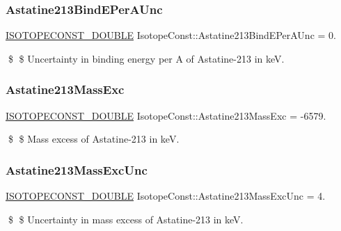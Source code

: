 \subsubsection{\texorpdfstring{Astatine213\+Bind\+E\+Per\+A\+Unc}{Astatine213BindEPerAUnc}}
{\footnotesize\ttfamily \mbox{\hyperlink{group___isotope_const-_macros_ga8f45a7272ce02c0b4c65c44636ed719a}{I\+S\+O\+T\+O\+P\+E\+C\+O\+N\+S\+T\+\_\+\+D\+O\+U\+B\+LE}} Isotope\+Const\+::\+Astatine213\+Bind\+E\+Per\+A\+Unc = 0.}

\$ \$ Uncertainty in binding energy per A of Astatine-\/213 in keV. \mbox{\label{group___isotope_const-_astatine-_at213_ga7dea592f634bada2e31da2b286c00a4a}} 
\subsubsection{\texorpdfstring{Astatine213\+Mass\+Exc}{Astatine213MassExc}}
{\footnotesize\ttfamily \mbox{\hyperlink{group___isotope_const-_macros_ga8f45a7272ce02c0b4c65c44636ed719a}{I\+S\+O\+T\+O\+P\+E\+C\+O\+N\+S\+T\+\_\+\+D\+O\+U\+B\+LE}} Isotope\+Const\+::\+Astatine213\+Mass\+Exc = -\/6579.}

\$ \$ Mass excess of Astatine-\/213 in keV. \mbox{\label{group___isotope_const-_astatine-_at213_gae94319c85ced600ca4a82c6e0fb8f604}} 
\subsubsection{\texorpdfstring{Astatine213\+Mass\+Exc\+Unc}{Astatine213MassExcUnc}}
{\footnotesize\ttfamily \mbox{\hyperlink{group___isotope_const-_macros_ga8f45a7272ce02c0b4c65c44636ed719a}{I\+S\+O\+T\+O\+P\+E\+C\+O\+N\+S\+T\+\_\+\+D\+O\+U\+B\+LE}} Isotope\+Const\+::\+Astatine213\+Mass\+Exc\+Unc = 4.}

\$ \$ Uncertainty in mass excess of Astatine-\/213 in keV. \mbox{\label{group___isotope_const-_astatine-_at213_ga4bda74973592c975144a2c3d34c1e63d}} 
